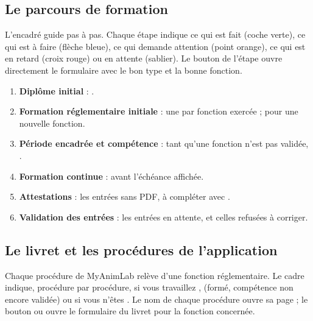 \documentclass[11pt,a4paper]{article}
\begin{document}
\subsection{Le parcours de formation}
L'encadré  guide pas à pas. Chaque étape
indique ce qui est fait (coche verte), ce qui est à faire (flèche bleue), ce
qui demande attention (point orange), ce qui est en retard (croix rouge) ou
en attente (sablier). Le bouton de l'étape ouvre directement le formulaire
 avec le bon type et la bonne fonction.


\begin{enumerate}
  \item \textbf{Diplôme initial} : .
  \item \textbf{Formation réglementaire initiale} : une par fonction
    exercée ;  pour une nouvelle fonction.
  \item \textbf{Période encadrée et compétence} : tant qu'une fonction n'est
    pas validée, .
  \item \textbf{Formation continue} :  avant l'échéance affichée.
  \item \textbf{Attestations} : les entrées sans PDF, à compléter avec
    .
  \item \textbf{Validation des entrées} : les entrées en attente, et celles
    refusées à corriger.
\end{enumerate}

\subsection{Le livret et les procédures de l'application}\label{sec:livret-procedures}
Chaque procédure de MyAnimLab relève d'une fonction réglementaire. Le cadre
 indique, procédure par procédure,
si vous travaillez ,  (formé, compétence non
encore validée) ou si vous n'êtes . Le nom de chaque procédure ouvre sa page ; le bouton
 ou  ouvre le
formulaire du livret pour la fonction concernée.
\end{document}
